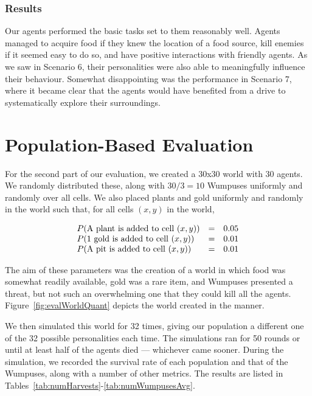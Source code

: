 \subsubsection{Results}

Our agents performed the basic tasks set to them reasonably well. Agents managed to acquire food if they knew the location of a food source, kill enemies if it seemed easy to do so, and have positive interactions with friendly agents. As we saw in Scenario 6, their personalities were also able to meaningfully influence their behaviour. Somewhat disappointing was the performance in Scenario 7, where it became clear that the agents would have benefited from a drive to systematically explore their surroundings.

\section{Population-Based Evaluation}

For the second part of our evaluation, we created a 30x30 world with 30 agents. We randomly distributed these, along with $30/3 = 10$ Wumpuses uniformly and randomly over all cells. We also placed plants and gold uniformly and randomly in the world such that, for all cells $(x,y)$ in the world,

$$
\begin{array}{l l l}
P(\textrm{A plant is added to cell } (x,y)) & = & 0.05\\
P(\textrm{1 gold is added to cell } (x,y)) & = & 0.01\\
P(\textrm{A pit is added to cell } (x,y)) & = & 0.01
\end{array}
$$

The aim of these parameters was the creation of a world in which food was somewhat readily available, gold was a rare item, and Wumpuses presented a threat, but not such an overwhelming one that they could kill all the agents. Figure~\ref{fig:evalWorldQuant} depicts the world created in the manner.

We then simulated this world for 32 times, giving our population a different one of the 32 possible personalities each time. The simulations ran for 50 rounds or until at least half of the agents died --- whichever came sooner. During the simulation, we recorded the survival rate of each population and that of the Wumpuses, along with a number of other metrics. The results are listed in Tables~\ref{tab:numHarvests}-\ref{tab:numWumpusesAvg}.

